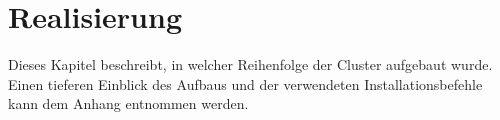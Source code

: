 \newpage
\section{Realisierung} 
\label{sec:Realisierung}
Dieses Kapitel beschreibt, in welcher Reihenfolge der Cluster aufgebaut wurde. Einen tieferen Einblick des Aufbaus und der verwendeten Installationsbefehle kann dem Anhang entnommen werden.


